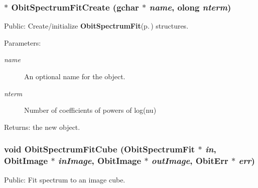 \subsubsection{$\ast$ Obit\-Spectrum\-Fit\-Create (gchar $\ast$ {\em name}, {\bf olong} {\em nterm})}\label{ObitSpectrumFit_8h_a10}


Public: Create/initialize {\bf Obit\-Spectrum\-Fit}{\rm (p.\,\pageref{structObitSpectrumFit})} structures. 

\begin{Desc}
\item[Parameters:]
\begin{description}
\item[{\em name}]An optional name for the object. \item[{\em nterm}]Number of coefficients of powers of log(nu) \end{description}
\end{Desc}
\begin{Desc}
\item[Returns:]the new object. \end{Desc}
\subsubsection{\setlength{\rightskip}{0pt plus 5cm}void Obit\-Spectrum\-Fit\-Cube ({\bf Obit\-Spectrum\-Fit} $\ast$ {\em in}, {\bf Obit\-Image} $\ast$ {\em in\-Image}, {\bf Obit\-Image} $\ast$ {\em out\-Image}, {\bf Obit\-Err} $\ast$ {\em err})}\label{ObitSpectrumFit_8h_a14}


Public: Fit spectrum to an image cube. 

